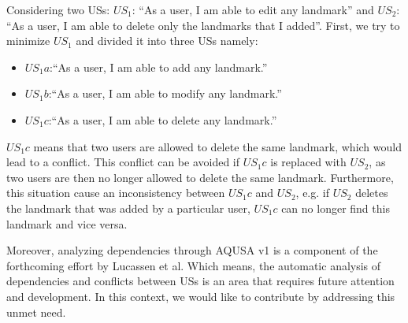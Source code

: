 \begin{example}\label{example_conflict}
Considering two USs:  $US_1$: \enquote{As a user, I am able to edit any landmark} and $US_2$: \enquote{As a user, I am able to delete only the landmarks that I added}. First, we try to minimize $US_1$ and divided it into three USs namely:
\begin{itemize}
\item $US_1a$:\enquote{As a user, I am able to add any landmark.}
\item $US_1b$:\enquote{As a user, I am able to modify any landmark.}
\item $US_1c$:\enquote{As a user, I am able to delete any landmark.}
\end{itemize}
$US_1c$ means that two users are allowed to delete the same landmark, which would lead to a conflict. %
This conflict can be avoided if $US_1c$ is replaced with $US_2$, as two users are then no longer allowed to delete the same landmark.
Furthermore, this situation cause an inconsistency between $US_1c$ and $US_2$, e.g. if $US_2$ deletes the landmark that was added by a particular user, $US_1c$ can no longer find this landmark and vice versa.
\end{example}


Moreover, analyzing dependencies through AQUSA v1 is a component of the forthcoming effort by Lucassen et al. Which means, the automatic analysis of dependencies and conflicts between USs is an area that requires future attention and development. In this context, we would like to contribute by addressing this unmet need.


